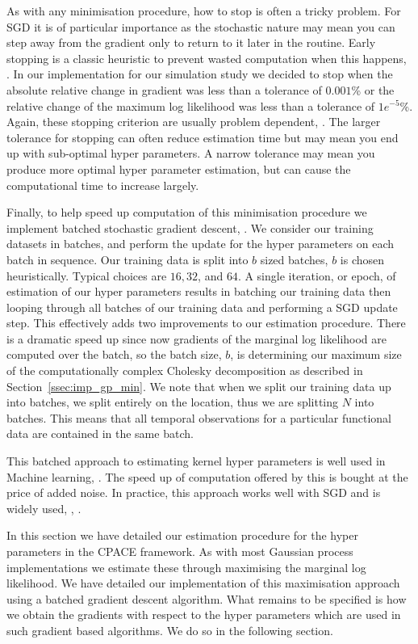As with any minimisation procedure, how to stop is often a tricky problem.
For SGD it is of particular importance as the stochastic nature may mean you can step away from the gradient only to return to it later in the routine.
Early stopping is a classic heuristic to prevent wasted computation when this happens, \citep{sra_optimization_2012}.
In our implementation for our simulation study we decided to stop when the absolute relative change in gradient was less than a tolerance of $0.001$\% or the relative change of the maximum log likelihood was less than a tolerance of $1e^{-5}$\%. 
Again, these stopping criterion are usually problem dependent, \citep{sra_optimization_2012}.
The larger tolerance for stopping can often reduce estimation time but may mean you end up with sub-optimal hyper parameters.
A narrow tolerance may mean you produce more optimal hyper parameter estimation, but can cause the computational time to increase largely.

Finally, to help speed up computation of this minimisation procedure we implement batched stochastic gradient descent, \citep{li_efficient_2014}.
We consider our training datasets in batches, and perform the update for the hyper parameters on each batch in sequence.
Our training data is split into $b$ sized batches, $b$ is chosen heuristically.
Typical choices are $16, 32$, and $64$.
A single iteration, or epoch, of estimation of our hyper parameters results in batching our training data then looping through all batches of our training data and performing a SGD update step.
This effectively adds two improvements to our estimation procedure.
There is a dramatic speed up since now gradients of the marginal log likelihood are computed over the batch, so the batch size, $b$, is determining our maximum size of the computationally complex Cholesky decomposition as described in Section~\ref{ssec:imp_gp_min}.
We note that when we split our training data up into batches, we split entirely on the location, thus we are splitting $N$ into batches.
This means that all temporal observations for a particular functional data are contained in the same batch.

This batched approach to estimating kernel hyper parameters is well used in Machine learning, \citep{li_efficient_2014}. 
The speed up of computation offered by this is bought at the price of added noise.
In practice, this approach works well with SGD and is widely used, \citep{li_efficient_2014}, \citep{sra_optimization_2012}.

In this section we have detailed our estimation procedure for the hyper parameters in the CPACE framework.
As with most Gaussian process implementations we estimate these through maximising the marginal log likelihood.
We have detailed our implementation of this maximisation approach using a batched gradient descent algorithm. 
What remains to be specified is how we obtain the gradients with respect to the hyper parameters which are used in such gradient based algorithms.
We do so in the following section.

